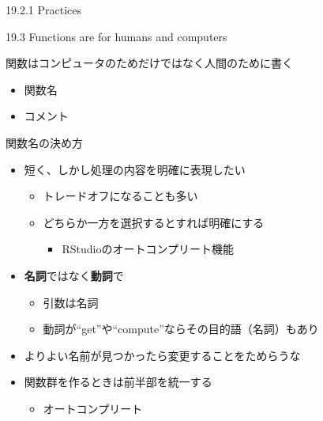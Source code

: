 \documentclass[ignorenonframetext,]{beamer}
\providecommand{\tightlist}{%
  \setlength{\itemsep}{0pt}\setlength{\parskip}{0pt}}
\begin{document}
\begin{frame}{19.2.1 Practices}

\end{frame}

\begin{frame}{19.3 Functions are for humans and computers}

関数はコンピュータのためだけではなく人間のために書く

\begin{itemize}
\tightlist
\item
  関数名
\item
  コメント
\end{itemize}

\end{frame}

\begin{frame}{関数名の決め方}

\begin{itemize}
\tightlist
\item
  短く、しかし処理の内容を明確に表現したい

  \begin{itemize}
  \tightlist
  \item
    トレードオフになることも多い
  \item
    どちらか一方を選択するとすれば明確にする

    \begin{itemize}
    \tightlist
    \item
      RStudioのオートコンプリート機能
    \end{itemize}
  \end{itemize}
\item
  \textbf{名詞}ではなく\textbf{動詞}で

  \begin{itemize}
  \tightlist
  \item
    引数は名詞
  \item
    動詞が``get''や``compute''ならその目的語（名詞）もあり
  \end{itemize}
\item
  よりよい名前が見つかったら変更することをためらうな
\item
  関数群を作るときは前半部を統一する

  \begin{itemize}
  \tightlist
  \item
    オートコンプリート
  \end{itemize}
\end{itemize}

\end{frame}
\end{document}
